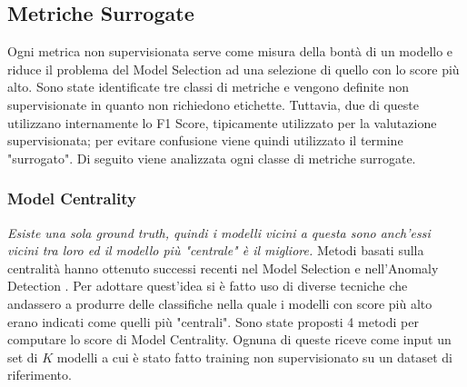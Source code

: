 \subsection{Metriche Surrogate}
Ogni metrica non supervisionata serve come misura della bontà di un modello e riduce il problema del Model Selection ad una selezione di quello con lo score più alto. 
Sono state identificate tre classi di metriche e vengono definite non supervisionate in quanto non richiedono etichette. Tuttavia, due di queste utilizzano internamente lo F1 Score, tipicamente utilizzato per la valutazione supervisionata; per evitare confusione viene quindi utilizzato il termine "surrogato".
Di seguito viene analizzata ogni classe di metriche surrogate. 


\subsubsection{Model Centrality}
\textit{Esiste una sola ground truth, quindi i modelli vicini a questa sono anch'essi vicini tra loro ed il modello più "centrale" è il migliore.}
Metodi basati sulla centralità hanno ottenuto successi recenti nel Model Selection e nell'Anomaly Detection \cite{DBLP:journals/corr/abs-2104-01422}. 
Per adottare quest'idea si è fatto uso di diverse tecniche che andassero a produrre delle classifiche nella quale i modelli con score più alto erano indicati come quelli più "centrali".
Sono state proposti 4 metodi per computare lo score di Model Centrality. Ognuna di queste riceve come input un set di $K$ modelli a cui è stato fatto training non supervisionato su un dataset di riferimento. 
